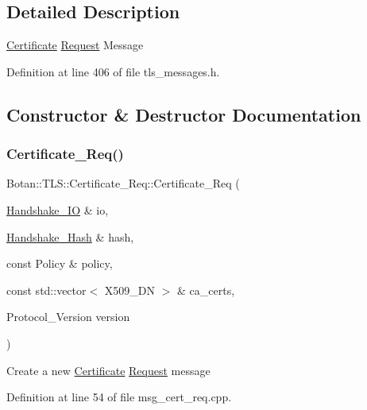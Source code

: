 \subsection{Detailed Description}
\mbox{\hyperlink{class_botan_1_1_t_l_s_1_1_certificate}{Certificate}} \mbox{\hyperlink{struct_request}{Request}} Message 

Definition at line 406 of file tls\+\_\+messages.\+h.



\subsection{Constructor \& Destructor Documentation}
\mbox{\label{class_botan_1_1_t_l_s_1_1_certificate___req_aceabb73e01693471af3201a7a81c0792}} 
\subsubsection{\texorpdfstring{Certificate\+\_\+\+Req()}{Certificate\_Req()}\hspace{0.1cm}{\footnotesize\ttfamily [1/2]}}
{\footnotesize\ttfamily Botan\+::\+T\+L\+S\+::\+Certificate\+\_\+\+Req\+::\+Certificate\+\_\+\+Req (\begin{DoxyParamCaption}\item[{\mbox{\hyperlink{class_botan_1_1_t_l_s_1_1_handshake___i_o}{Handshake\+\_\+\+IO}} \&}]{io,  }\item[{\mbox{\hyperlink{class_botan_1_1_t_l_s_1_1_handshake___hash}{Handshake\+\_\+\+Hash}} \&}]{hash,  }\item[{const Policy \&}]{policy,  }\item[{const std\+::vector$<$ X509\+\_\+\+DN $>$ \&}]{ca\+\_\+certs,  }\item[{Protocol\+\_\+\+Version}]{version }\end{DoxyParamCaption})}

Create a new \mbox{\hyperlink{class_botan_1_1_t_l_s_1_1_certificate}{Certificate}} \mbox{\hyperlink{struct_request}{Request}} message 

Definition at line 54 of file msg\+\_\+cert\+\_\+req.\+cpp.

